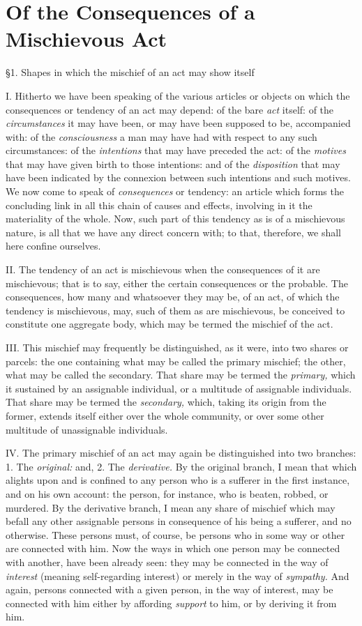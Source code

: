 \documentclass[12pt]{report}
\begin{document}
\chapter{Of the Consequences of a Mischievous Act}

§1. Shapes in which the mischief of an act may show itself

I. Hitherto we have been speaking of the various articles or objects on
which the consequences or tendency of an act may depend: of the bare
\emph{act} itself: of the \emph{circumstances} it may have been, or may
have been supposed to be, accompanied with: of the \emph{consciousness}
a man may have had with respect to any such circumstances: of the
\emph{intentions} that may have preceded the act: of the \emph{motives}
that may have given birth to those intentions: and of the
\emph{disposition} that may have been indicated by the connexion between
such intentions and such motives. We now come to speak of
\emph{consequences} or tendency: an article which forms the concluding
link in all this chain of causes and effects, involving in it the
materiality of the whole. Now, such part of this tendency as is of a
mischievous nature, is all that we have any direct concern with; to
that, therefore, we shall here confine ourselves.

II. The tendency of an act is mischievous when the consequences of it
are mischievous; that is to say, either the certain consequences or the
probable. The consequences, how many and whatsoever they may be, of an
act, of which the tendency is mischievous, may, such of them as are
mischievous, be conceived to constitute one aggregate body, which may be
termed the mischief of the act.

III. This mischief may frequently be distinguished, as it were, into two
shares or parcels: the one containing what may be called the primary
mischief; the other, what may be called the secondary. That share may be
termed the \emph{primary,} which it sustained by an assignable
individual, or a multitude of assignable individuals. That share may be
termed the \emph{secondary,} which, taking its origin from the former,
extends itself either over the whole community, or over some other
multitude of unassignable individuals.

IV. The primary mischief of an act may again be distinguished into two
branches: 1. The \emph{original:} and, 2. The \emph{derivative.} By the
original branch, I mean that which alights upon and is confined to any
person who is a sufferer in the first instance, and on his own account:
the person, for instance, who is beaten, robbed, or murdered. By the
derivative branch, I mean any share of mischief which may befall any
other assignable persons in consequence of his being a sufferer, and no
otherwise. These persons must, of course, be persons who in some way or
other are connected with him. Now the ways in which one person may be
connected with another, have been already seen: they may be connected in
the way of \emph{interest} (meaning self-regarding interest) or merely
in the way of \emph{sympathy.} And again, persons connected with a given
person, in the way of interest, may be connected with him either by
affording \emph{support} to him, or by deriving it from him.
\end{document}
